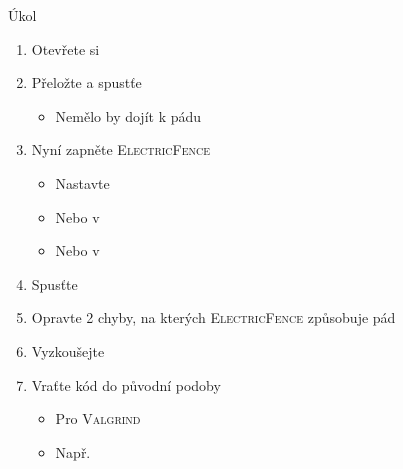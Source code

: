 \begin{frame}{Úkol}

  \begin{enumerate}
    \item Otevřete si \ifpcdirlinux {} \else
       \fi
    \item Přeložte a spustťe
    \begin{itemize}
      \item Nemělo by dojít k pádu
    \end{itemize}

    \item Nyní zapněte \textsc{ElectricFence}
    \begin{itemize}
      \item Nastavte 
\ifpcdirlinux
      \item Nebo  v 
\else
      \item Nebo  v 
\fi
    \end{itemize}

    \item Spusťte
    \item Opravte 2 chyby, na kterých \textsc{ElectricFence} způsobuje pád
    \item Vyzkoušejte
    \item Vraťte kód do původní podoby
    \begin{itemize}
      \item Pro \textsc{Valgrind}
      \item Např.\ 
    \end{itemize}
  \end{enumerate}

\end{frame}
